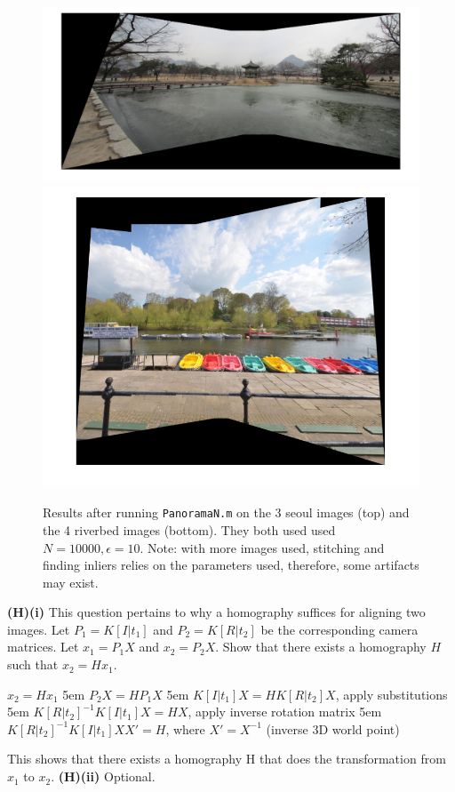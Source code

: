 \documentclass[12pt,twoside]{article}
\begin{document}
\begin{figure}[h]
  \begin{center}
    \includegraphics[width=.75\linewidth, trim= 0pt 20pt 0pt 20pt, clip]{pano_3.png}
    \includegraphics[width=.52\linewidth, trim= 0pt 20pt 0pt 20pt, clip]{pano_4.png}

  \end{center}
  \caption{Results after running \texttt{PanoramaN.m} on the 3 seoul images (top) and the 4 riverbed images (bottom).  They both used used $N=10000, \epsilon=10$. Note: with more images used, stitching and finding inliers relies on the parameters used, therefore, some artifacts may exist.}
\end{figure}

\textbf{(H)(i)} This question pertains to why a homography suffices for aligning two images.  Let $P_{1} = K[I|t_{1}]$ and $P_{2} = K[R|t_{2}]$ be the corresponding camera matrices. Let $x_{1} = P_{1}X$ and $x_{2} = P_{2}X$. Show that there exists a homography $H$ such that $x_{2} = Hx_{1}$.\newline

\hspace{40pt} $x_{2} = Hx_{1}$\newline
\hangindent5em $P_{2}X = HP_{1}X$\newline
\hangindent5em $K[I|t_{1}]X = HK[R|t_{2}]X$, apply substitutions\newline
\hangindent5em $K[R|t_{2}]^{-1} K[I|t_{1}] X  = HX$, apply inverse rotation matrix\newline
\hangindent5em $ K[R|t_{2}]^{-1} K[I|t_{1}] X X' = H$, where $X'=X^{-1}$ (inverse 3D world point)\newline

This shows that there exists a homography H that does the transformation from $x_{1}$ to $x_{2}$.\newline\newline
\textbf{(H)(ii)} Optional.
\end{document}
